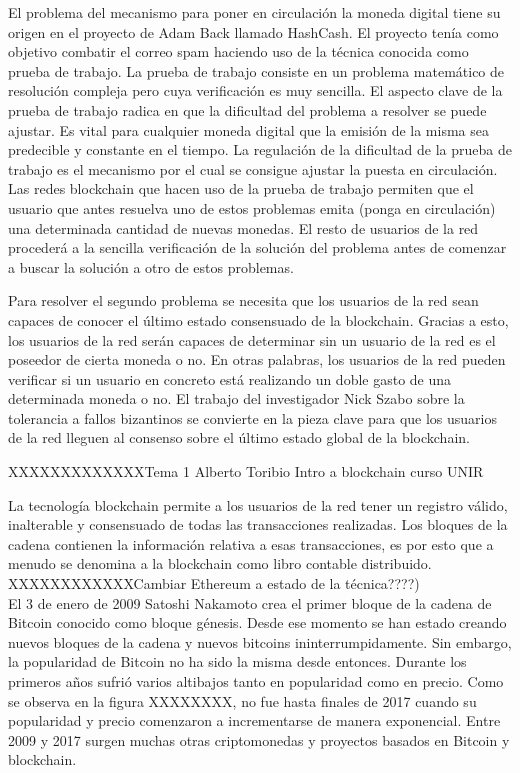 El problema del mecanismo para poner en circulación la moneda digital tiene su origen en el proyecto de Adam Back llamado HashCash. El proyecto tenía como objetivo combatir el correo spam haciendo uso de la técnica conocida como prueba de trabajo. La prueba de trabajo consiste en un problema matemático de resolución compleja pero cuya verificación es muy sencilla. El aspecto clave de la prueba de trabajo radica en que la dificultad del problema a resolver se puede ajustar. Es vital para cualquier moneda digital que la emisión de la misma sea predecible y constante en el tiempo. La regulación de la dificultad de la prueba de trabajo es el mecanismo por el cual se consigue ajustar la puesta en circulación. Las redes blockchain que hacen uso de la prueba de trabajo permiten que el usuario que antes resuelva uno de estos problemas emita (ponga en circulación) una determinada cantidad de nuevas monedas. El resto de usuarios de la red procederá a la sencilla verificación de la solución del problema antes de comenzar a buscar la solución a otro de estos problemas. \newline

Para resolver el segundo problema se necesita que los usuarios de la red sean capaces de conocer el último estado consensuado de la blockchain. Gracias a esto, los usuarios de la red serán capaces de determinar sin un usuario de la red es el poseedor de cierta moneda o no. En otras palabras, los usuarios de la red pueden verificar si un usuario en concreto está realizando un doble gasto de una determinada moneda o no. El trabajo del investigador Nick Szabo sobre la tolerancia a fallos bizantinos se convierte en la pieza clave para que los usuarios de la red lleguen al consenso sobre el último estado global de la blockchain. \newline

XXXXXXXXXXXXXTema 1 Alberto Toribio Intro a blockchain curso UNIR \newline

La tecnología blockchain permite a los usuarios de la red tener un registro válido, inalterable y consensuado de todas las transacciones realizadas. Los bloques de la cadena contienen la información relativa a esas transacciones, es por esto que a menudo se denomina a la blockchain como libro contable distribuido. \\
XXXXXXXXXXXXCambiar Ethereum a estado de la técnica????) \\
El 3 de enero de 2009 Satoshi Nakamoto crea el primer bloque de la cadena de Bitcoin conocido como bloque génesis. Desde ese momento se han estado creando nuevos bloques de la cadena y nuevos bitcoins ininterrumpidamente. Sin embargo, la popularidad de Bitcoin no ha sido la misma desde entonces. Durante los primeros años sufrió varios altibajos tanto en popularidad como en precio. Como se observa en la figura XXXXXXXX, no fue hasta finales de 2017 cuando su popularidad y precio comenzaron a incrementarse de manera exponencial. Entre 2009 y 2017 surgen muchas otras criptomonedas y proyectos basados en Bitcoin y blockchain.\newline

